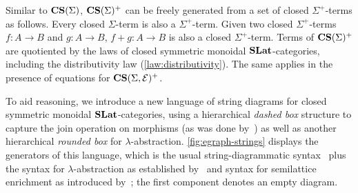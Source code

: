 Similar to $\mathbf{CS}(\Sigma)$, $\mathbf{CS}(\Sigma)^{+}$ can be freely generated from a set of closed $\Sigma^{+}$-terms as follows.
Every closed $\Sigma$-term is also a $\Sigma^{+}$-term.
Given two closed $\Sigma^{+}$-terms $f\colon A \to B$ and $g\colon A \to B$, $f + g\colon A \to B$ is also a closed $\Sigma^{+}$-term.
Terms of $\mathbf{CS}(\Sigma)^{+}$ are quotiented by the laws of closed symmetric monoidal $\mathbf{SLat}$-categories, including the distributivity law (\autoref{law:distributivity}).
The same applies in the presence of equations for $\mathbf{CS}(\Sigma,\mathcal{E})^{+}$.

To aid reasoning, we introduce a new language of string diagrams for closed symmetric monoidal $\mathbf{SLat}$-categories, using a hierarchical \emph{dashed box} structure to capture the join operation on morphisms (as was done by~\citet{tiurin2025equivalencehypergraphsdporewriting}) as well as another hierarchical \emph{rounded box} for $\lambda$-abstraction.
\autoref{fig:egraph-strings} displays the generators of this language, which is the usual string-diagrammatic syntax~\cite{Selinger_2010} plus the syntax for $\lambda$-abstraction as established by~\citet{ghica2024stringdiagramslambdacalculifunctional} and syntax for semilattice enrichment as introduced by~\citet{tiurin2025equivalencehypergraphsdporewriting}; the first component denotes an empty diagram.




